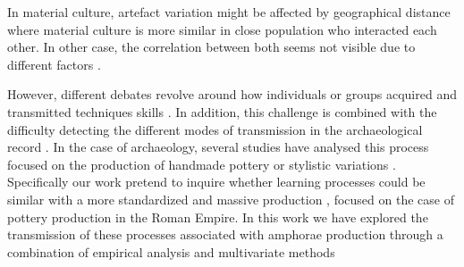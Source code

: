 \documentclass[review]{elsarticle}
\begin{document}
 
In material culture, artefact variation might be affected by geographical distance \citep{bjorklund_effect_2010,shennan_isolation-by-distance_2015, van_strien_isolation-by-distance_2015} where material culture is more similar in close population who interacted each other. In other case, the correlation between both seems not visible due to different factors \citep{hart_effects_2012}. 





However, different debates revolve around how individuals or groups acquired and transmitted techniques skills  \citep{bowser_learning_2008, mesoudi_cultural_2008}. In addition, this challenge is combined with the difficulty detecting the different modes of transmission in the archaeological record \citep{roux_standardization_2015}. In the case of archaeology, several studies have analysed this process focused on the production of handmade pottery \citep{steele_james_ceramic_2010} or stylistic variations \citep{neiman_stylistic_1995, shennan_ceramic_2001}. Specifically our work pretend to inquire whether learning processes could be similar with a more standardized and massive production \citep{gandon_copying_2014}, focused on the case of pottery production in the Roman Empire. In this work we have explored the transmission of these processes associated with amphorae production through a combination of empirical analysis and multivariate methods
                     
\end{document}
